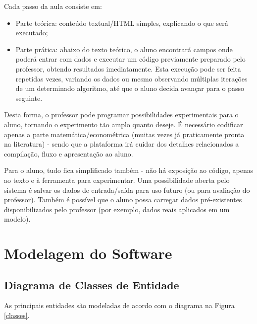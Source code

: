 \documentclass{abnt}
\begin{document}
Cada passo da aula consiste em:
\begin{itemize}
\item Parte teórica: conteúdo textual/HTML simples, explicando o que será executado; 
\item Parte prática: abaixo do texto teórico, o aluno encontrará campos onde poderá entrar com dados e executar um código previamente preparado pelo professor, obtendo resultados imediatamente. Esta execução pode ser feita repetidas vezes, variando os dados ou mesmo observando múltiplas iterações de um determinado algoritmo, até que o aluno decida avançar para o passo seguinte.
\end{itemize}

Desta forma, o professor pode programar possibilidades experimentais para o aluno, tornando o experimento tão amplo quanto deseje. É necessário codificar apenas a parte matemática/econométrica (muitas vezes já praticamente pronta na literatura) - sendo que a plataforma irá cuidar dos detalhes relacionados a compilação, fluxo e apresentação ao aluno.

	Para o aluno, tudo fica simplificado também - não há exposição ao código, apenas ao texto e à ferramenta para experimentar. Uma possibilidade aberta pelo sistema é salvar os dados de entrada/saída para uso futuro (ou para avaliação do professor). Também é possível que o aluno possa carregar dados pré-existentes disponibilizados pelo professor (por exemplo, dados reais aplicados em um modelo).


\section {Modelagem do Software}

\subsection{Diagrama de Classes de Entidade}
As principais entidades são modeladas de acordo com o diagrama na Figura \ref{classes}.
\end{document}
